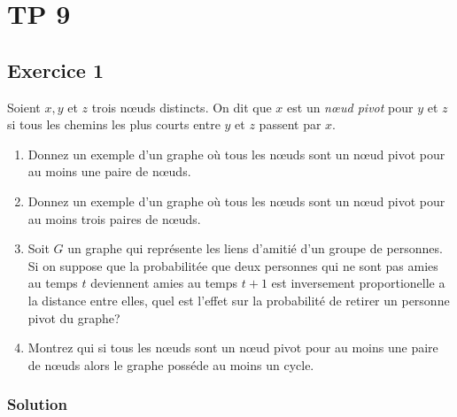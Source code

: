 \section{TP 9}


\subsection*{Exercice 1}
Soient $x, y$ et $z$ trois n\oe{}uds distincts. On dit que $x$ est un \emph{n\oe{}ud pivot} pour $y$ et $z$ si tous les chemins les plus courts entre $y$ et $z$ passent par $x$.

\begin{enumerate}
\item Donnez un exemple d'un graphe o\`{u} tous les n\oe{}uds sont un n\oe{}ud pivot pour au moins une paire de n\oe{}uds.
\item Donnez un exemple d'un graphe o\`{u} tous les n\oe{}uds sont un n\oe{}ud pivot pour au moins trois paires de n\oe{}uds.
\item Soit $G$ un graphe qui repr\'{e}sente les liens d'amiti\'{e} d'un groupe de personnes. Si on suppose que la probabilit\'{e}e que deux personnes qui ne sont pas amies au
temps $t$ deviennent amies au temps $t + 1$ est inversement proportionelle a la distance entre elles, quel est l'effet sur la probabilit\'{e} de retirer un personne pivot du graphe?
\item Montrez qui si tous les n\oe{}uds sont un n\oe{}ud pivot pour au moins une paire de n\oe{}uds alors le graphe poss\'{e}de au moins un cycle.
\end{enumerate}

\subsubsection*{Solution}

